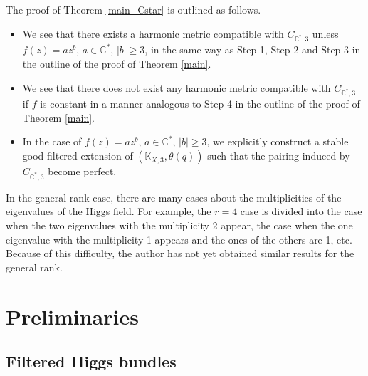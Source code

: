 \documentclass[10pt,a4paper]{amsart}
\numberwithin{equation}{section}
\newcommand{\C}{\mathbb{C}}
\begin{document}
The proof of Theorem \ref{main_Cstar} is outlined as follows.
\begin{itemize}\itemsep=0pt\setlength{\leftskip}{0.55cm}
 \item[{\bf Step 1$'$}] We see that there exists a harmonic metric compatible with $C_{\C^*,3}$ unless $f(z)= az^b$, $a\in \C^*$, $|b|\geq 3$, in the same way as Step 1, Step 2 and Step 3 in the outline of the proof of Theorem \ref{main}.
 \item[{\bf Step 2$'$}] We see that there does not exist any harmonic metric compatible with $C_{\C^*,3}$ if $f$ is constant in a manner analogous to Step 4 in the outline of the proof of Theorem \ref{main}.
 \item[{\bf Step 3$'$}] In the case of $f(z)=az^b$, $a\in \C^*$, $|b|\geq 3$, we explicitly construct a stable good filtered extension of $(\mathbb{K}_{X,3},\theta(q))$ such that the pairing induced by $C_{\C^*,3}$ become perfect.
\end{itemize}

In the general rank case, there are many cases about the multiplicities of the eigenvalues of the Higgs field. For example, the $r=4$ case is divided into the case when the two eigenvalues with the multiplicity 2 appear, the case when the one eigenvalue with the multiplicity 1 appears and the ones of the others are 1, etc. Because of this difficulty, the author has not yet obtained similar results for the general rank.

\section{Preliminaries}\label{sec2}
\subsection{Filtered Higgs bundles}
\end{document}
